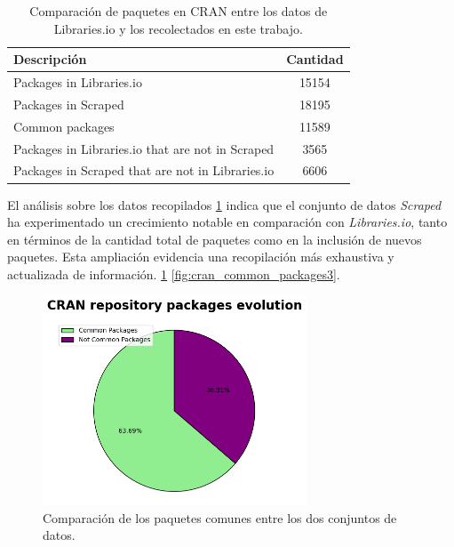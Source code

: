 \begin{table}[ht!]
    \begin{center}
        \begin{tabular}{|l|c|}
            \hline
            \textbf{Descripción}                            & \textbf{Cantidad} \\
            \hline
            Packages in Libraries.io                         & 15154             \\
            Packages in Scraped                             & 18195             \\
            Common packages                                 & 11589             \\
            Packages in Libraries.io that are not in Scraped & 3565              \\
            Packages in Scraped that are not in Libraries.io & 6606              \\
            \hline
        \end{tabular}
        \caption{Comparación de paquetes en CRAN entre los datos de Libraries.io y los recolectados en este trabajo.}
        \label{tab:cran_common_packages}
    \end{center}
\end{table}

El análisis sobre los datos recopilados \ref{tab:cran_common_packages} indica que el conjunto de datos \textit{Scraped}
ha experimentado un crecimiento notable en comparación con \textit{Libraries.io}, tanto en
términos de la cantidad total de paquetes como en la inclusión de nuevos paquetes.
Esta ampliación evidencia una recopilación más exhaustiva y actualizada de información. \ref{fig:cran_common_packages2}
\ref{fig:cran_common_packages3}.

\begin{figure}[ht!]
    \begin{center}
        \includegraphics[width=0.7\textwidth]{img/cran/circle.png}
        \caption{Comparación de los paquetes comunes entre los dos conjuntos de datos.}
        \label{fig:cran_common_packages2}
    \end{center}
\end{figure}

